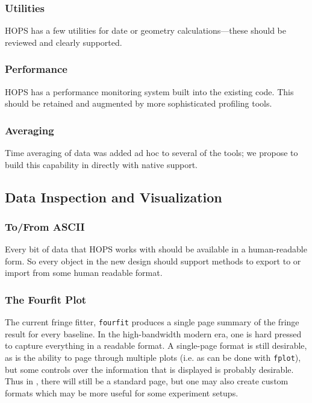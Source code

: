 \subsubsection{Utilities}
\label{sec:utils}
HOPS has a few utilities for date or geometry calculations---these
should be reviewed and clearly supported.

\subsubsection{Performance}
\label{sec:perform}
HOPS has a performance monitoring system built into the existing code.
This should be retained and augmented by more sophisticated profiling tools.

\subsubsection{Averaging}
\label{sec:average}
Time averaging of data was added ad hoc to several of the tools; we
propose to build this capability in directly with native support.

\subsection{Data Inspection and Visualization}
\label{sec:inspect}

\subsubsection{To/From ASCII}
\label{sec:ascii}
Every bit of data that HOPS works with should be available in a human-readable
form.  So every object in the new design should support methods to export to
or import from some human readable format.

\subsubsection{The Fourfit Plot}
\label{sec:fplot}
The current fringe fitter, \texttt{fourfit} produces a single page summary
of the fringe result for every baseline.  In the high-bandwidth modern era,
one is hard pressed to capture everything in a readable format.  A single-page
format is still desirable, as is the ability to page through multiple plots
(i.e. as can be done with \texttt{fplot}), but some controls over the
information that is displayed is probably desirable.  Thus in \nuHOPS,
there will still be a standard page, but one may also create custom formats
which may be more useful for some experiment setups.

